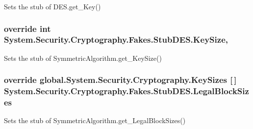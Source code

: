 Sets the stub of D\-E\-S.\-get\-\_\-\-Key()

\hypertarget{class_system_1_1_security_1_1_cryptography_1_1_fakes_1_1_stub_d_e_s_aa671db5b6d066da1768ea1d6c8edcdfc}{
\subsubsection[{Key\-Size}]{\setlength{\rightskip}{0pt plus 5cm}override int System.\-Security.\-Cryptography.\-Fakes.\-Stub\-D\-E\-S.\-Key\-Size\hspace{0.3cm}{\ttfamily [get]}, {\ttfamily [set]}}}\label{class_system_1_1_security_1_1_cryptography_1_1_fakes_1_1_stub_d_e_s_aa671db5b6d066da1768ea1d6c8edcdfc}


Sets the stub of Symmetric\-Algorithm.\-get\-\_\-\-Key\-Size()

\hypertarget{class_system_1_1_security_1_1_cryptography_1_1_fakes_1_1_stub_d_e_s_a0a40f88d98b5c7783ad732bd22586e04}{
\subsubsection[{Legal\-Block\-Sizes}]{\setlength{\rightskip}{0pt plus 5cm}override global.\-System.\-Security.\-Cryptography.\-Key\-Sizes \mbox{[}$\,$\mbox{]} System.\-Security.\-Cryptography.\-Fakes.\-Stub\-D\-E\-S.\-Legal\-Block\-Sizes\hspace{0.3cm}{\ttfamily [get]}}}\label{class_system_1_1_security_1_1_cryptography_1_1_fakes_1_1_stub_d_e_s_a0a40f88d98b5c7783ad732bd22586e04}


Sets the stub of Symmetric\-Algorithm.\-get\-\_\-\-Legal\-Block\-Sizes()

